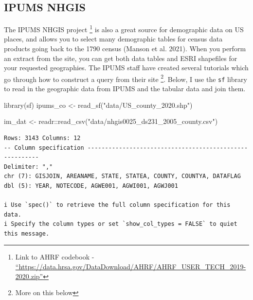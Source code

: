 \documentclass[
  letterpaper,
  DIV=11,
  numbers=noendperiod]{scrreprt}
\newenvironment{Shaded}{\begin{snugshade}}{\end{snugshade}}
\newcommand{\FunctionTok}[1]{\textcolor[rgb]{0.28,0.35,0.67}{#1}}
\newcommand{\NormalTok}[1]{\textcolor[rgb]{0.00,0.23,0.31}{#1}}
\newcommand{\OtherTok}[1]{\textcolor[rgb]{0.00,0.23,0.31}{#1}}
\newcommand{\SpecialCharTok}[1]{\textcolor[rgb]{0.37,0.37,0.37}{#1}}
\newcommand{\StringTok}[1]{\textcolor[rgb]{0.13,0.47,0.30}{#1}}
\begin{document}
\hypertarget{ipums-nhgis}{%
\subsection{IPUMS NHGIS}\label{ipums-nhgis}}

The IPUMS NHGIS project \footnote{Link to AHRF codebook -
  \href{https://data.hrsa.gov/DataDownload/AHRF/AHRF_USER_TECH_2019-2020.zip}{``https://data.hrsa.gov/DataDownload/AHRF/AHRF\_USER\_TECH\_2019-2020.zip''}}
is also a great source for demographic data on US places, and allows you
to select many demographic tables for census data products going back to
the 1790 census (Manson et al. 2021). When you perform an extract from
the site, you can get both data tables and ESRI shapefiles for your
requested geographies. The IPUMS staff have created several tutorials
which go through how to construct a query from their site \footnote{More
  on this below}. Below, I use the \texttt{sf} library to read in the
geographic data from IPUMS and the tabular data and join them.

\begin{Shaded}
\begin{Highlighting}[]
\FunctionTok{library}\NormalTok{(sf)}
\NormalTok{ipums\_co }\OtherTok{\textless{}{-}} \FunctionTok{read\_sf}\NormalTok{(}\StringTok{"data/US\_county\_2020.shp"}\NormalTok{)}


\NormalTok{im\_dat }\OtherTok{\textless{}{-}}\NormalTok{ readr}\SpecialCharTok{::}\FunctionTok{read\_csv}\NormalTok{(}\StringTok{"data/nhgis0025\_ds231\_2005\_county.csv"}\NormalTok{)}
\end{Highlighting}
\end{Shaded}

\begin{verbatim}
Rows: 3143 Columns: 12
-- Column specification --------------------------------------------------------
Delimiter: ","
chr (7): GISJOIN, AREANAME, STATE, STATEA, COUNTY, COUNTYA, DATAFLAG
dbl (5): YEAR, NOTECODE, AGWE001, AGWI001, AGWJ001

i Use `spec()` to retrieve the full column specification for this data.
i Specify the column types or set `show_col_types = FALSE` to quiet this message.
\end{verbatim}
\end{document}

